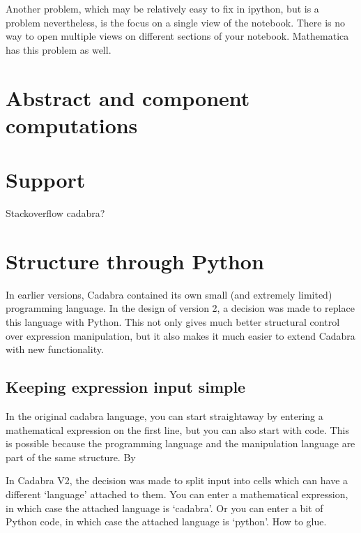 \documentclass[11pt]{article}
\begin{document}
Another problem, which may be relatively easy to fix in ipython, but
is a problem nevertheless, is the focus on a single view of the
notebook. There is no way to open multiple views on different sections
of your notebook. Mathematica has this problem as well.


\section{Abstract and component computations}


\section{Support}

Stackoverflow cadabra?

\section{Structure through Python}

In earlier versions, Cadabra contained its own small (and extremely
limited) programming language. In the design of version 2, a decision
was made to replace this language with Python. This not only gives
much better structural control over expression manipulation, but it
also makes it much easier to extend Cadabra with new functionality.


\subsection{Keeping expression input simple}

In the original cadabra language, you can start straightaway by
entering a mathematical expression on the first line, but you can also
start with code.  This is possible because the programming language
and the manipulation language are part of the same structure. By

In Cadabra V2, the decision was made to split input into cells which
can have a different `language' attached to them. You can enter a
mathematical expression, in which case the attached language is
`cadabra'. Or you can enter a bit of Python code, in which case the
attached language is `python'. How to glue.
\end{document}

